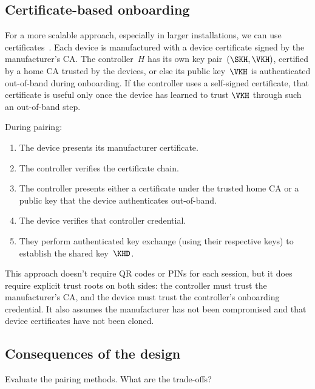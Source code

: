 \subsection{Certificate-based onboarding}

For a more scalable approach, especially in larger installations, we can use
certificates~\autocite{Kohnfelder1978}.
Each device is manufactured with a device certificate signed by the
manufacturer's \ac{CA}.
The controller~\(H\) has its own key pair~\((\SKH, \VKH)\), certified by a
home \ac{CA} trusted by the devices, or else its public key~\(\VKH\) is
authenticated out-of-band during onboarding.
If the controller uses a self-signed certificate, that certificate is useful
only once the device has learned to trust \(\VKH\) through such an out-of-band
step.

During pairing:
\begin{enumerate}
  \item The device presents its manufacturer certificate.
  \item The controller verifies the certificate chain.
  \item The controller presents either a certificate under the trusted
    home \ac{CA} or a public key that the device authenticates
    out-of-band.
  \item The device verifies that controller credential.
  \item They perform authenticated key exchange (using their respective
    keys) to establish the shared key~\(\KHD\).
\end{enumerate}

This approach doesn't require QR codes or PINs for each session, but it does
require explicit trust roots on both sides: the controller must trust the
manufacturer's \ac{CA}, and the device must trust the controller's
onboarding credential.
It also assumes the manufacturer has not been compromised and that device
certificates have not been cloned.

\subsection{Consequences of the design}

\begin{exercise}
  Evaluate the pairing methods.
  What are the trade-offs?
\end{exercise}

